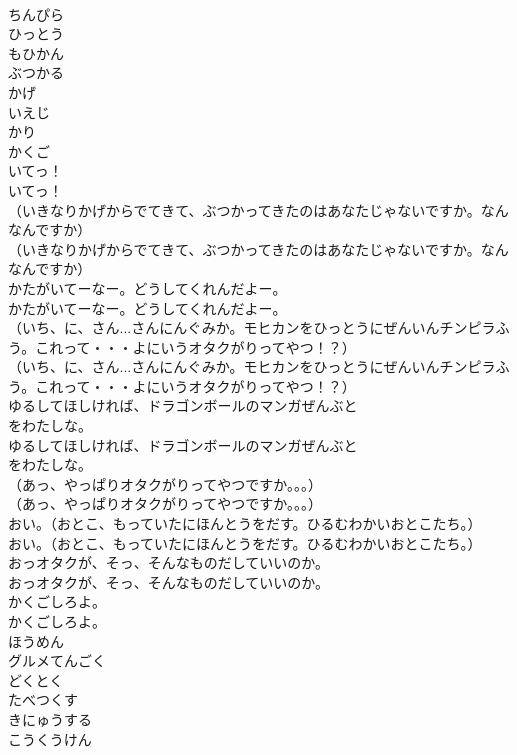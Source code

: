 \documentclass[8pt]{extreport}
\begin{document}
\begin{CJK}{UTF8}{min}
\\	ちんぴら
\\	ひっとう
\\	もひかん
\\	ぶつかる
\\	かげ
\\	いえじ
\\	かり
\\	かくご
\\	いてっ！	
\\	いてっ！ 
\\	（いきなりかげからでてきて、ぶつかってきたのはあなたじゃないですか。なんなんですか）	
\\	（いきなりかげからでてきて、ぶつかってきたのはあなたじゃないですか。なんなんですか） 
\\	かたがいてーなー。どうしてくれんだよー。	
\\	かたがいてーなー。どうしてくれんだよー。 
\\	（いち、に、さん...さんにんぐみか。モヒカンをひっとうにぜんいんチンピラふう。これって・・・よにいうオタクがりってやつ！？）	
\\	（いち、に、さん...さんにんぐみか。モヒカンをひっとうにぜんいんチンピラふう。これって・・・よにいうオタクがりってやつ！？） 
\\	ゆるしてほしければ、ドラゴンボールのマンガぜんぶと
\\	をわたしな。	
\\	ゆるしてほしければ、ドラゴンボールのマンガぜんぶと
\\	をわたしな。 
\\	（あっ、やっぱりオタクがりってやつですか。。。）	
\\	（あっ、やっぱりオタクがりってやつですか。。。） 
\\	おい。（おとこ、もっていたにほんとうをだす。ひるむわかいおとこたち。）	
\\	おい。（おとこ、もっていたにほんとうをだす。ひるむわかいおとこたち。） 
\\	おっオタクが、そっ、そんなものだしていいのか。	
\\	おっオタクが、そっ、そんなものだしていいのか。 
\\	かくごしろよ。	
\\	かくごしろよ。 
\\	ほうめん
\\	グルメてんごく
\\	どくとく
\\	たべつくす
\\	きにゅうする
\\	こうくうけん

\end{CJK}
\end{document}
